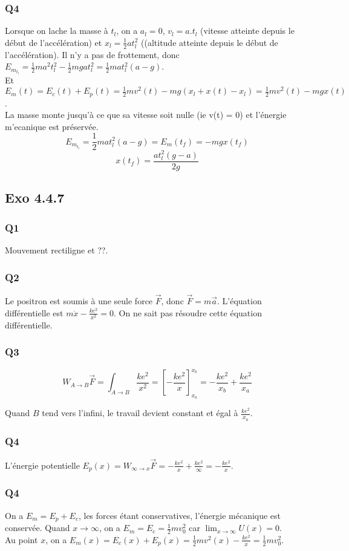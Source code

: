 \documentclass[]{book}
\theoremstyle{definition}
\begin{document}
\subsubsection{Q4}
Lorsque on lache la masse \`a $t_l$, on a $a_l=0$, $v_l = a.t_l$ (vitesse atteinte depuis le d\'ebut de l'acc\'el\'eration) et $x_l = \frac{1}{2}a{t_l^2}$ ((altitude atteinte depuis le d\'ebut de l'acc\'el\'eration). Il n'y a pas de frottement, donc $E_{m_{t_l}} = \frac{1}{2}ma^2t_l^2 - \frac{1}{2}mga{t_l^2} = \frac{1}{2}mat_l^2(a-g)$. \\
Et $E_m(t) = E_c(t) + E_p(t) = \frac{1}{2}mv^2(t) - mg(x_l + x(t)- x_l) = \frac{1}{2}mv^2(t) - mgx(t)$. \\
La masse monte jusqu'\`a ce que sa vitesse soit nulle (ie v(t) = 0) et l'\'energie m'ecanique est pr\'eserv\'ee.\\
$$E_{m_{t_l}} = \frac{1}{2}mat_l^2(a-g) = E_m(t_f) = -mgx(t_f) $$
$$x(t_f) = \frac{at_l^2(g-a)}{2g}$$

\subsection*{Exo 4.4.7}
\subsubsection{Q1}
Mouvement rectiligne et ??.

\subsubsection{Q2}
Le positron est soumis \`a une seule force $\overrightarrow{F}$, donc $\overrightarrow{F} = m\overrightarrow{a}$. L'\'equation diff\'erentielle est $m\ddot{x} - \frac{ke^2}{x^2} = 0$. On ne sait pas r\'esoudre cette \'equation diff\'erentielle.

\subsubsection{Q3}
$$W_{A \to B}\overrightarrow{F} = \int_{A \to B} \frac{ke^2}{x^2} = [-\frac{ke^2}{x}]_{x_a}^{x_b} = -\frac{ke^2}{x_b} + \frac{ke^2}{x_a}$$

Quand $B$ tend vers l'infini, le travail devient constant et \'egal \`a $\frac{ke^2}{x_a}$.

\subsubsection{Q4}
L'\'energie potentielle $E_p(x) = W_{\infty \to x}\overrightarrow{F} = -\frac{ke^2}{x} + \frac{ke^2}{\infty} = -\frac{ke^2}{x}$.\\

\subsubsection{Q4}
On a $E_m = E_p + E_c$, les forces \'etant conservatives, l'\'energie m\'ecanique est conserv\'ee. Quand $x \to \infty$, on a $E_m = E_c = \frac{1}{2}mv_0^2$ car $\lim_{x \to \infty}U(x) = 0$.\\
Au point $x$, on a $E_m(x) = E_c(x) + E_p(x) = \frac{1}{2}mv^2(x) - \frac{ke^2}{x} = \frac{1}{2}mv_0^2$. 
 
\end{document}
